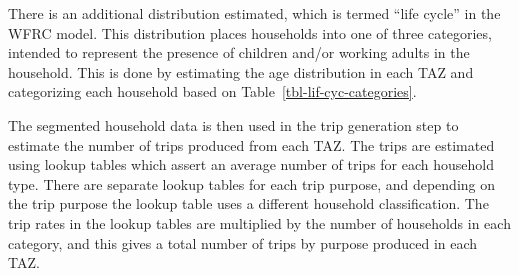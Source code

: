 \documentclass[fancy, oneside, mastersfancy, ms]{byuthesis}
\begin{document}
\begin{table}

\caption{\label{tbl-income-groups}Income Groups in the WFRC Model}


\end{table}%

There is an additional distribution estimated, which is termed ``life
cycle'' in the WFRC model. This distribution places households into one
of three categories, intended to represent the presence of children
and/or working adults in the household. This is done by estimating the
age distribution in each TAZ and categorizing each household based on
Table~\ref{tbl-lif-cyc-categories}.

\begin{table}

\caption{\label{tbl-lif-cyc-categories}Life Cycle Categories in the WFRC
Model}


\end{table}%

The segmented household data is then used in the trip generation step to
estimate the number of trips produced from each TAZ. The trips are
estimated using lookup tables which assert an average number of trips
for each household type. There are separate lookup tables for each trip
purpose, and depending on the trip purpose the lookup table uses a
different household classification. The trip rates in the lookup tables
are multiplied by the number of households in each category, and this
gives a total number of trips by purpose produced in each TAZ.
\end{document}
